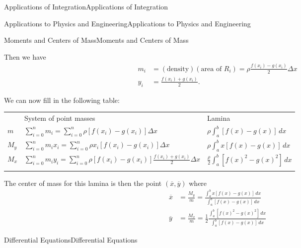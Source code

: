 \documentclass[10pt,]{book}
\numberwithin{equation}{section}
\newcommand{\hrulethick} {\noalign{\hrule height 0.11em}}
\newcommand{\amp}{&}
\begin{document}
\begin{chapterptx}{Applications of Integration}{}{Applications of Integration}{}{}
\begin{sectionptx}{Applications to Physics and Engineering}{}{Applications to Physics and Engineering}{}{}
\begin{subsectionptx}{Moments and Centers of Mass}{}{Moments and Centers of Mass}{}{}
\begin{figure}
{
}
\end{figure}
\hypertarget{p-712}{}%
Then we have%
\begin{align*}
m_{i} \amp= (\text{density})(\text{area of }R_{i}) = \rho\frac{f(x_{i})-g(x_{i})}{2}\Delta x\\
y_{i} \amp= \frac{f(x_{i})+g(x_{i})}{2}.
\end{align*}
%
\par
\hypertarget{p-713}{}%
We can now fill in the following table:%
\begin{table}
\centering
\begin{tabular}{lll}\hrulethick
&System of point masses&Lamina\tabularnewline\hrulethick
\(m\)&\(\sum_{i=0}^{n}m_{i} = \sum_{i=0}^{n}\rho[f(x_{i})-g(x_{i})]\Delta x\)&\(\rho\int_{a}^{b}[f(x)-g(x)]\,dx\)\tabularnewline[0pt]
\(M_{y}\)&\(\sum_{i=0}^{n}m_{i}x_{i} = \sum_{i=0}^{n}\rho x_{i}[f(x_{i})-g(x_{i})]\Delta x\)&\(\rho\int_{a}^{b}x[f(x)-g(x)]\,dx\)\tabularnewline[0pt]
\(M_{x}\)&\(\sum_{i=0}^{n}m_{i}y_{i} = \sum_{i=0}^{n}\rho[f(x_{i})-g(x_{i})]\frac{f(x_{i})+g(x_{i})}{2}\Delta x\)&\(\frac{\rho}{2}\int_{a}^{b}[f(x)^{2}-g(x)^{2}]\,dx\)\tabularnewline\hrulethick
\end{tabular}
\end{table}
\hypertarget{p-714}{}%
The center of mass for this lamina is then the point \((\overline{x},\overline{y})\) where%
\begin{align*}
\overline{x} \amp= \frac{M_{y}}{m} = \frac{\int_{a}^{b}x[f(x)-g(x)]\,dx}{\int_{a}^{b}[f(x)-g(x)]\,dx}\\
\overline{y} \amp= \frac{M_{x}}{m} = \frac{1}{2}\frac{\int_{a}^{b}[f(x)^{2}-g(x)^{2}]\,dx}{\int_{a}^{b}[f(x)-g(x)]\,dx}
\end{align*}
%
\end{subsectionptx}
\end{sectionptx}
%
%
\typeout{************************************************}
\typeout{************************************************}
%
\begin{sectionptx}{Differential Equations}{}{Differential Equations}{}{}\label{section-differential-equations}

\end{sectionptx}
\end{chapterptx}
\end{document}
